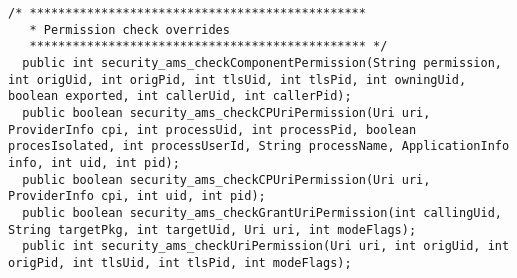\documentclass[letterpaper,twocolumn,10pt]{article}
\begin{document}
\begin{lstlisting}[emph={},basicstyle=\footnotesize,caption={Interface for Access Control Policy Modules}]
  /* ***********************************************
   * Permission check overrides
   *********************************************** */
  public int security_ams_checkComponentPermission(String permission, int origUid, int origPid, int tlsUid, int tlsPid, int owningUid, boolean exported, int callerUid, int callerPid);
  public boolean security_ams_checkCPUriPermission(Uri uri, ProviderInfo cpi, int processUid, int processPid, boolean procesIsolated, int processUserId, String processName, ApplicationInfo info, int uid, int pid);
  public boolean security_ams_checkCPUriPermission(Uri uri, ProviderInfo cpi, int uid, int pid);
  public boolean security_ams_checkGrantUriPermission(int callingUid, String targetPkg, int targetUid, Uri uri, int modeFlags);
  public int security_ams_checkUriPermission(Uri uri, int origUid, int origPid, int tlsUid, int tlsPid, int modeFlags);
  

\end{lstlisting}
\end{document}
